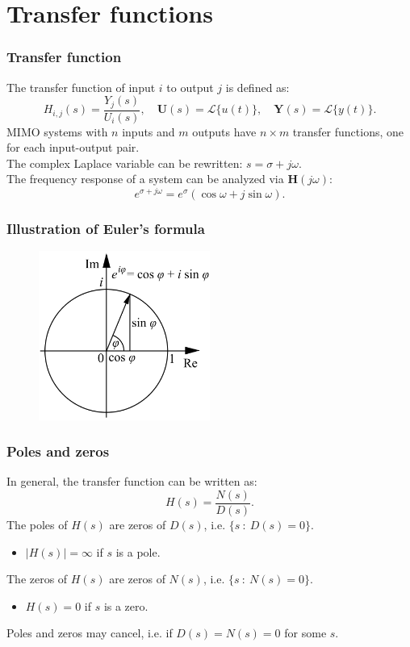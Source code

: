 \section{Transfer functions}

\begin{frame}
\frametitle{Transfer function}
The transfer function of input $i$ to output $j$ is defined as:
\begin{equation*}
H_{i,j}(s) = \frac{Y_j(s)}{U_i(s)},\quad \mathbf{U}(s) = \mathcal{L}\{u(t)\},\quad \mathbf{Y}(s) = \mathcal{L}\{y(t)\}.
\end{equation*}
MIMO systems with $n$ inputs and $m$ outputs have $n\times m$ transfer functions, one for each input-output pair.\\
The complex Laplace variable can be rewritten: $s = \sigma + j\omega$. \\
The frequency response of a system can be analyzed via $\mathbf{H}(j\omega)$:
\begin{equation*}
e^{\sigma + j\omega} = e^\sigma ( \cos \omega + j \sin \omega ).
\end{equation*}
\end{frame}

\begin{frame}
\frametitle{Illustration of Euler's formula}
\begin{figure}
\centering
\includegraphics[width=0.5\textwidth]{euler.png}
\end{figure}
\end{frame}

\begin{frame}
\frametitle{Poles and zeros}
In general, the transfer function can be written as:
\begin{equation*}
H(s) = \frac{N(s)}{D(s)}.
\end{equation*}
The poles of $H(s)$ are zeros of $D(s)$, i.e. $\{s\ :\ D(s) = 0\}$.\\
\begin{itemize}
\item $|H(s)|=\infty$ if $s$ is a pole.
\end{itemize}
The zeros of $H(s)$ are zeros of $N(s)$, i.e. $\{s\ :\ N(s) = 0\}$. \\
\begin{itemize}
\item $H(s)=0$ if $s$ is a zero.
\end{itemize}
Poles and zeros may cancel, i.e. if $D(s)=N(s)=0$ for some $s$.
\end{frame}

